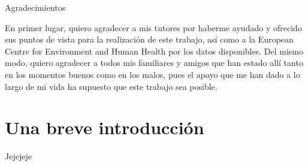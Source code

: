 \documentclass[12pt]{article}
\begin{document}
\newpage
\vspace{10cm}
\newpage
\Huge Agradecimientos

\vspace{0.5cm}
\normalsize En primer lugar, quiero agradecer a mis tutores por haberme ayudado y ofrecido sus puntos de vista para la realización de este trabajo, así como a la European Centre for Environment and Human Health por los datos disponibles. Del mismo modo, quiero agradecer a todos mis familiares y amigos que han estado allí tanto en los momentos buenos como en los malos, pues el apoyo que me han dado a lo largo de mi vida ha supuesto que este trabajo sea posible.

\newpage
\tableofcontents
\newpage

\section{Una breve introducción} 

Jejejeje
\end{document}
